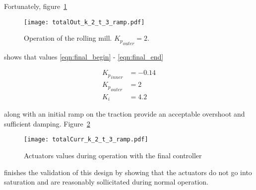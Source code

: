 Fortunately, figure~\ref{fig:totalOut_k_2_t_3}
\begin{figure}[htbp]
  \centering
  \texttt{[image: totalOut\_k\_2\_t\_3\_ramp.pdf]}
  \caption{Operation of the rolling mill. ${K_p}_{outer} = 2$.\label{fig:totalOut_k_2_t_3}}
\end{figure}
shows that values \ref{eqn:final_begin} - \ref{eqn:final_end}
\begin{figure*}[htb]
\begin{align}
  {K_p}_{inner} &= -0.14\label{eqn:final_begin}\\
  {K_p}_{outer} &= 2\\
  K_i &= 4.2\label{eqn:final_end}
\end{align}
\end{figure*}
along with an initial ramp on the traction provide an acceptable overshoot and sufficient damping. Figure~\ref{fig:totalCurr_k_2_t_3_ramp}
\begin{figure}[htbp]
  \centering
  \texttt{[image: totalCurr\_k\_2\_t\_3\_ramp.pdf]}
  \caption{Actuators values during operation with the final controller\label{fig:totalCurr_k_2_t_3_ramp}}
\end{figure}
finishes the validation of this design by showing that the actuators do not go into saturation and are reasonably sollicitated during normal operation.

